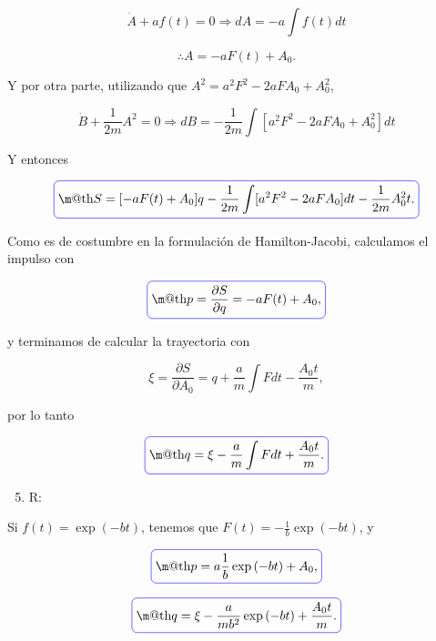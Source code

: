 \documentclass[a4paper,10pt]{article}
\makeatletter
\numberwithin{equation}{section}
\newcommand*{\boxcolor}{blue}
\renewcommand{\boxed}[1]{\textcolor{\boxcolor}{%
\tikz[baseline={([yshift=-1ex]current bounding box.center)}] \node [rectangle, minimum width=1ex,rounded corners,draw] {\normalcolor\m@th$\displaystyle#1$};}}
\makeatother
\begin{document}
\begin{equation}
 \dot{A} + af(t) = 0 \Rightarrow dA = - a\int f(t)dt
\end{equation}

\begin{equation}
 \therefore A = -aF(t) + A_0.
\end{equation}

Y por otra parte, utilizando que $A^2 = a^2F^2 - 2aFA_0 + A_0^2$, 

\begin{equation}
 \dot{B} + \frac{1}{2m}A^2 = 0 \Rightarrow dB = 
 - \frac{1}{2m} \int [a^2F^2 - 2aFA_0 + A_0^2] dt
\end{equation}

Y entonces 

\begin{equation}
 \boxed{S = [-aF(t) + A_0]q  - \frac{1}{2m} \int [a^2F^2 - 2aFA_0] dt - \frac{1}{2m}A_0^2t.}
\end{equation}

Como es de costumbre en la formulación de Hamilton-Jacobi, calculamos el impulso 
con 

\begin{equation}
 \boxed{p = \frac{\partial S}{\partial q} = -aF(t) + A_0,}
\end{equation}

y terminamos de calcular la trayectoria con 

\begin{equation}
 \xi = \frac{\partial S}{\partial A_0} = q + \frac{a}{m}\int F dt - \frac{A_0t}{m},
\end{equation}

por lo tanto 

\begin{equation}
 \boxed{q = \xi - \frac{a}{m}\int F dt + \frac{A_0t}{m}.}
\end{equation}

\begin{enumerate}[label=\alph*)]
\setcounter{enumi}{4}
 \item R:
\end{enumerate}

Si $f(t) = \exp{(-bt)}$, tenemos que $F(t) = - \frac{1}{b}\exp{(-bt)}$, y 

\begin{equation}
 \boxed{p = a\frac{1}{b}\exp{(-bt)} + A_0,}
\end{equation}

\begin{equation}
 \boxed{q = \xi - \frac{a}{mb^2}\exp{(-bt)} + \frac{A_0t}{m}.}
\end{equation}
\end{document}
